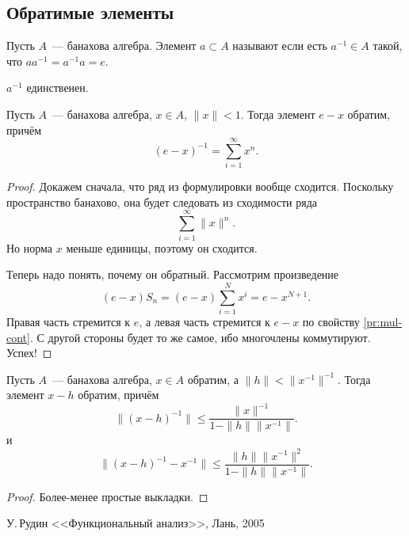 \documentclass{notes}
\begin{document}
\subsection{Обратимые элементы}

	\begin{de}
		Пусть $A$~--- банахова алгебра. Элемент $a \subset A$ называют  если есть $a^{-1} \in A$ такой, что $a a^{-1} = a^{-1} a = e$.
	\end{de}

	\begin{st}
		$a^{-1}$ единственен.
	\end{st}

	\begin{thm}
		Пусть $A$~--- банахова алгебра, $x \in A$, $\|x\| < 1$. Тогда элемент $e - x$ обратим, причём
		\[
			(e - x)^{-1} = \sum\limits_{i = 1}^{\infty} x^n.
		\]
		\begin{proof}	
			Докажем сначала, что ряд из формулировки вообще сходится. Поскольку пространство банахово, она будет следовать из сходимости ряда
			\[
				\sum\limits_{i = 1}^{\infty} \|x\|^n.
			\]
			Но норма $x$ меньше единицы, поэтому он сходится.

			Теперь надо понять, почему он обратный. Рассмотрим произведение
			\[
				(e - x) S_n = (e - x)\sum\limits_{i = 1}^N x^i = e - x^{N+1}.
			\]
			Правая часть стремится к $e$, а левая часть стремится к $e - x$ по свойству \ref{pr:mul-cont}. С другой стороны будет то же самое, ибо многочлены коммутируют. Успех!
		\end{proof}
	\end{thm}

	\begin{thm}
		Пусть $A$~--- банахова алгебра, $x \in A$ обратим, а $\|h\| < \|x^{-1}\|^{-1}$. Тогда элемент $x - h$ обратим, причём
		\[
			\big\|(x - h)^{-1}\big\|  \leqslant \dfrac{\|x\|^{-1}}{1 - \|h\| \|x^{-1}\|}. 
		\]
		и
		\[
			\big\|(x - h)^{-1} - x^{-1}\big\| \leqslant \dfrac{\|h\| \|x^{-1}\|^2}{1 - \|h\| \|x^{-1}\|}.
		\]
		\begin{proof}
			Более-менее простые выкладки.
		\end{proof}
	\end{thm}
\begin{thebibliography}{}

 У.$\,$Рудин <<Функциональный анализ>>, Лань, 2005

\end{thebibliography}{}
\end{document}
